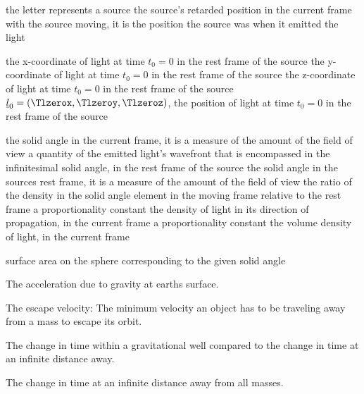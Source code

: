 {the letter represents a source}
{the source's retarded position in the current frame with the source moving, it is the position the source was when it emitted the light}

{the x-coordinate of light at time $t_0=0$ in the rest frame of the source}
{the y-coordinate of light at time $t_0=0$ in the rest frame of the source}
{the z-coordinate of light at time $t_0=0$ in the rest frame of the source}
{$\underline{l}_0=(\Tlzerox,\Tlzeroy,\Tlzeroz)$, the position of light at time $t_0=0$ in the rest frame of the source}

\variableterm{\TOmega}{\Omega}
{the solid angle in the current frame, it is a measure of the amount of the field of view}
{a quantity of the emitted light's wavefront that is encompassed in the infinitesimal solid angle, in the rest frame of the source}
{the solid angle in the sources rest frame, it is a measure of the amount of the field of view}
{the ratio of the density in the solid angle element in the moving frame relative to the rest frame}
{a proportionality constant}
{the density of light in its direction of propagation, in the current frame}
{a proportionality constant}
{the volume density of light, in the current frame}

{surface area on the sphere corresponding to the given solid angle}

{The acceleration due to gravity at earths surface.}

{The escape velocity: The minimum velocity an object has to be traveling away from a mass to escape its orbit.}

{The change in time within a gravitational well compared to the change in time at an infinite distance away.}

{The change in time at an infinite distance away from all masses.}
